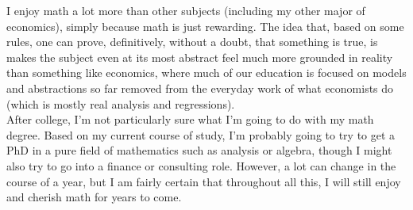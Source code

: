 \documentclass[8pt]{extarticle}
\begin{document}
  I enjoy math a lot more than other subjects (including my other major of economics), simply because math is just rewarding. The idea that, based on some rules, one can prove, definitively, without a doubt, that something is true, is makes the subject even at its most abstract feel much more grounded in reality than something like economics, where much of our education is focused on models and abstractions so far removed from the everyday work of what economists do (which is mostly real analysis and regressions).\\

  After college, I'm not particularly sure what I'm going to do with my math degree. Based on my current course of study, I'm probably going to try to get a PhD in a pure field of mathematics such as analysis or algebra, though I might also try to go into a finance or consulting role. However, a lot can change in the course of a year, but I am fairly certain that throughout all this, I will still enjoy and cherish math for years to come.
\end{document}
